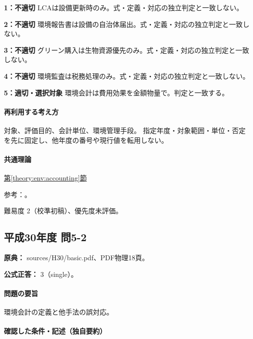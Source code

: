 \noindent\textbf{1：不適切} LCAは設備更新時のみ。式・定義・対応の独立判定と一致しない。\par

\noindent\textbf{2：不適切} 環境報告書は設備の自治体届出。式・定義・対応の独立判定と一致しない。\par

\noindent\textbf{3：不適切} グリーン購入は生物資源優先のみ。式・定義・対応の独立判定と一致しない。\par

\noindent\textbf{4：不適切} 環境監査は税務処理のみ。式・定義・対応の独立判定と一致しない。\par

\noindent\textbf{5：適切・選択対象} 環境会計は費用効果を金額物量で。判定と一致する。\par

\paragraph{再利用する考え方} 対象、評価目的、会計単位、環境管理手段。 指定年度・対象範囲・単位・否定を先に固定し、他年度の番号や現行値を転用しない。

\paragraph{共通理論} \hyperref[theory:env:accounting]{第\ref*{theory:env:accounting}節}

\par 参考：\cite{env58_accounting}。

\par 難易度 2（校準初稿）、優先度未評価。

\subsection{平成30年度 問5-2}
\label{q:h30-reg-basic-5-2}

\noindent\textbf{原典：} sources/H30/basic.pdf、PDF物理18頁。

\textbf{公式正答：} 3（single）。

\paragraph{問題の要旨} 環境会計の定義と他手法の誤対応。

\paragraph{確認した条件・記述（独自要約）}\mbox{}\par

